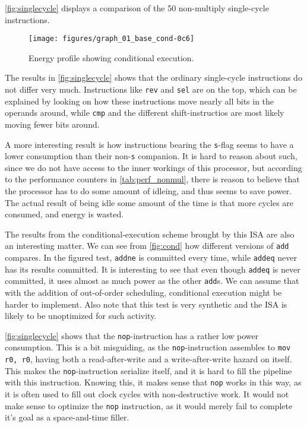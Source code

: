 \autoref{fig:singlecycle} displays a comparison of the 50 non-multiply
single-cycle instructions.

\begin{figure}
    \centering
    \texttt{[image: figures/graph\_01\_base\_cond-0c6]}
    \caption{Energy profile showing conditional execution.}
    \label{fig:cond}
\end{figure}

The results in \autoref{fig:singlecycle} shows that the ordinary single-cycle
instructions do not differ very much. Instructions like \texttt{rev} and
\texttt{sel} are on the top, which can be explained by looking on how these
instructions move nearly all bits in the operands around, while \texttt{cmp} and
the different shift-instructios are most likely moving fewer bits around.

A more interesting result is how instructions bearing the \texttt{s}-flag seems
to have a lower consumption than their non-\texttt{s} companion. It is hard to
reason about such, since we do not have access to the inner workings of this
processor, but according to the performance counters in
\autoref{tab:perf_nonmul}, there is reason to believe that the processor has to
do some amount of idleing, and thus seems to save power. The actual result of
being idle some amount of the time is that more cycles are consumed, and energy
is wasted.

The results from the conditional-execution scheme brought by this ISA are also
an interesting matter. We can see from \autoref{fig:cond} how different versions
of \texttt{add} compares. In the figured test, \texttt{addne} is committed every
time, while \texttt{addeq} never has its results committed. It is interesting to
see that even though \texttt{addeq} is never committed, it uses almost as much
power as the other \texttt{add}s. We can assume that with the addition of
out-of-order scheduling, conditional execution might be harder to implement.
Also note that this test is very synthetic and the ISA is likely to be
unoptimized for such activity.

\autoref{fig:singlecycle} shows that the \texttt{nop}-instruction has a rather
low power consumption. This is a bit misguiding, as the \texttt{nop}-instruction
assembles to \texttt{mov r0, r0}, having both a read-after-write and a
write-after-write hazard on itself. This makes the \texttt{nop}-instruction
serialize itself, and it is hard to fill the pipeline with this instruction.
Knowing this, it makes sense that \texttt{nop} works in this way, as it is often
used to fill out clock cycles with non-destructive work. It would not make sense
to optimize the \texttt{nop} instruction, as it would merely fail to complete
it's goal as a space-and-time filler.

